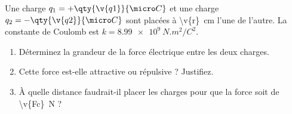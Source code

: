 Une charge $q_1 = +\qty{\v{q1}}{\micro C}$ et une charge $q_2 = -\qty{\v{q2}}{\micro C}$ sont placées à \qty{\v{r}}{cm} l'une de l'autre. La constante de Coulomb est $k = \qty{8.99e9}{N.m^2/C^2}$.

\begin{enumerate}[label=\alph*)]
    \item Déterminez la grandeur de la force électrique entre les deux charges.
    \item Cette force est-elle attractive ou répulsive ? Justifiez.
    \item À quelle distance faudrait-il placer les charges pour que la force soit de \qty{\v{Fc}}{N} ?
\end{enumerate}
